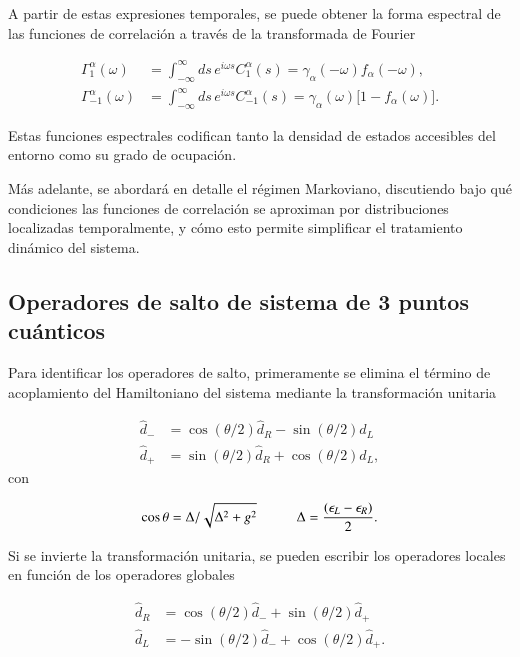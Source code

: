 \begin{appendixs}
A partir de estas expresiones temporales, se puede obtener la forma espectral de las funciones de correlación a través de la transformada de Fourier

\begin{align*}
    \Gamma_{1}^{\alpha}(\omega) &= \int_{-\infty}^{\infty} ds\, e^{i \omega s} C_{1}^{\alpha}(s) = \gamma_{\alpha}(-\omega) f_{\alpha}(-\omega), \\
    \Gamma_{-1}^{\alpha}(\omega) &= \int_{-\infty}^{\infty} ds\, e^{i \omega s} C_{-1}^{\alpha}(s) = \gamma_{\alpha}(\omega)\big[1 - f_{\alpha}(\omega)\big].
\end{align*}

Estas funciones espectrales codifican tanto la densidad de estados accesibles del entorno como su grado de ocupación.

Más adelante, se abordará en detalle el régimen Markoviano, discutiendo bajo qué condiciones las funciones de correlación se aproximan por distribuciones localizadas temporalmente, y cómo esto permite simplificar el tratamiento dinámico del sistema.

\label{apendix5bathcorre}

\subsection{ Operadores de salto de sistema de 3 puntos cuánticos}
Para identificar los operadores de salto, primeramente se elimina el término de acoplamiento del Hamiltoniano del sistema mediante la transformación unitaria

\begin{align*}
    \hat{d}_{-} & = \cos(\theta/2)\hat{d}_{R} - \sin(\theta/2)\hat{d}_{L} \\
    \hat{d}_{+} & = \sin(\theta/2)\hat{d}_{R} + \cos(\theta/2)\hat{d}_{L},
\end{align*}
con 

\begin{equation*}
    \cos \theta = \Delta/\sqrt{ \Delta^{2} + g^{2} } \hspace{10mm} \Delta = \frac{(\epsilon_{L}-\epsilon_{R})}{2}.
\end{equation*}

Si se invierte la transformación unitaria, se pueden escribir los operadores locales en función de los operadores globales 

\begin{align*}
    \hat{d}_{R} & = \cos(\theta/2)\hat{d}_{-} + \sin(\theta/2)\hat{d}_{+} \\
    \hat{d}_{L} & = -\sin(\theta/2)\hat{d}_{-} + \cos(\theta/2)\hat{d}_{+}.
\end{align*}


\end{appendixs}
